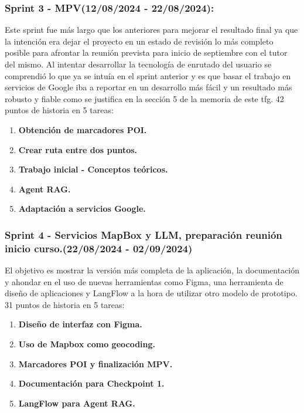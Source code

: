 \subsubsection{Sprint 3 - MPV(12/08/2024 - 22/08/2024):} 
Este sprint fue más largo que los anteriores para mejorar el resultado final ya que la intención era dejar el proyecto en un estado de revisión lo más completo posible para afrontar la reunión prevista para inicio de septiembre con el tutor del mismo. Al intentar desarrollar la tecnología de enrutado del usuario se comprendió lo que ya se intuía en el sprint anterior y es que basar el trabajo en servicios de Google iba a reportar en un desarrollo más fácil y un resultado más robusto y fiable como se justifica en la sección 5 de la memoria de este \acrshort{tfg}. 42 puntos de historia en 5 tareas:
    \begin{enumerate}
		\item \textbf{Obtención de marcadores POI.}
		\item \textbf{Crear ruta entre dos puntos.}
		\item \textbf{Trabajo inicial - Conceptos teóricos.}
		\item \textbf{Agent RAG.}
		\item \textbf{Adaptación a servicios Google.}
	\end{enumerate}
    
    
\subsubsection{Sprint 4 - Servicios MapBox y LLM, preparación reunión inicio curso.(22/08/2024 - 02/09/2024)}
    El objetivo es mostrar la versión más completa de la aplicación, la documentación y ahondar en el uso de nuevas herramientas como Figma, una herramienta de diseño de aplicaciones y LangFlow a la hora de utilizar otro modelo de prototipo. 31 puntos de historia en 5 tareas:
\begin{enumerate}
	\item \textbf{Diseño de interfaz con Figma.}
	\item \textbf{Uso de Mapbox como geocoding.}
	\item \textbf{Marcadores POI y finalización MPV.}
	\item \textbf{Documentación para Checkpoint 1.}
	\item \textbf{LangFlow para Agent RAG.}
\end{enumerate}
    

